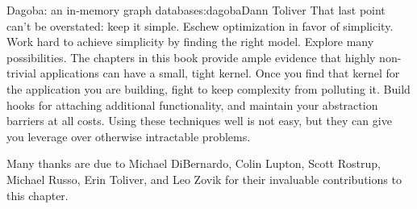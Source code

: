 \begin{aosachapter}{Dagoba: an in-memory graph database}{s:dagoba}{Dann Toliver}
That last point can't be overstated: keep it simple. Eschew optimization
in favor of simplicity. Work hard to achieve simplicity by finding the
right model. Explore many possibilities. The chapters in this book
provide ample evidence that highly non-trivial applications can have a
small, tight kernel. Once you find that kernel for the application you
are building, fight to keep complexity from polluting it. Build hooks
for attaching additional functionality, and maintain your abstraction
barriers at all costs. Using these techniques well is not easy, but they
can give you leverage over otherwise intractable problems.

\label{acknowledgements}

Many thanks are due to Michael DiBernardo, Colin Lupton, Scott Rostrup,
Michael Russo, Erin Toliver, and Leo Zovik for their invaluable
contributions to this chapter.

\end{aosachapter}
